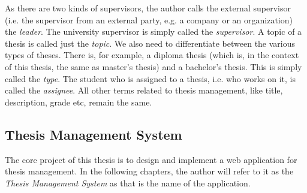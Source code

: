 As there are two kinds of supervisors, the author calls the external supervisor (i.e. the supervisor from an external party, e.g. a company or an organization) the \emph{leader}. The university supervisor is simply called the \emph{supervisor}. A topic of a thesis is called just the \emph{topic}. We also need to differentiate between the various types of theses. There is, for example, a diploma thesis (which is, in the context of this thesis, the same as master's thesis) and a bachelor's thesis. This is simply called the \emph{type}. The student who is assigned to a thesis, i.e. who works on it, is called the \emph{assignee}. All other terms related to thesis management, like title, description, grade etc, remain the same.

\subsection{Thesis Management System}

The core project of this thesis is to design and implement a web application for thesis management. In the following chapters, the author will refer to it as the \emph{Thesis Management System} as that is the name of the application.